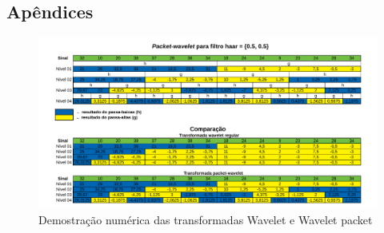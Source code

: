 	\begin{apendicesenv}
	
	\partapendices
	\chapter{Apêndices}
			
			\begin{landscape}
					\begin{figure}[h]
						\includegraphics[width=1\linewidth]{images/haarWaveletExamples.pdf}
						\caption{Demostração numérica das transformadas Wavelet e Wavelet packet}
						\label{fig:haarWaveletExamples}
					\end{figure}
			\end{landscape}
			\begin{figure}[h]
				\centering

\end{figure}
\end{apendicesenv}
